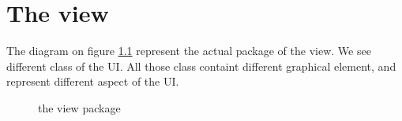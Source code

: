 \chapter{The view}

The diagram on figure \ref{view} represent the actual package of the view. We see different class of the UI. All those class containt different graphical element, and represent different aspect of the UI.

  \begin{figure}[h!]
  \centering
  \caption{the view package}
\label{view} 
 \end{figure}



\clearpage
